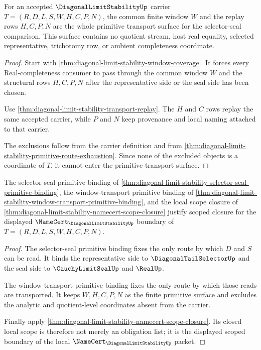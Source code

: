 \begin{theorem}
\label{thm:diagonal-limit-stability-window-transport-primitive-binding}
For an accepted $\DiagonalLimitStabilityUp$ carrier $T=(R,D,L,S,W,H,C,P,N)$, the common finite window $W$ and the replay rows $H,C,P,N$ are the whole primitive transport surface for the selector-seal comparison. This surface contains no quotient stream, host real equality, selected representative, trichotomy row, or ambient completeness coordinate.
\end{theorem}
\begin{proof}
Start with \autoref{thm:diagonal-limit-stability-window-coverage}. It forces every Real-completeness consumer to pass through the common window $W$ and the structural rows $H,C,P,N$ after the representative side or the seal side has been chosen.

Use \autoref{thm:diagonal-limit-stability-transport-replay}. The $H$ and $C$ rows replay the same accepted carrier, while $P$ and $N$ keep provenance and local naming attached to that carrier.

The exclusions follow from the carrier definition and from \autoref{thm:diagonal-limit-stability-primitive-route-exhaustion}. Since none of the excluded objects is a coordinate of $T$, it cannot enter the primitive transport surface.
\end{proof}

\begin{theorem}
\label{thm:diagonal-limit-stability-scoped-namecert-boundary}
The selector-seal primitive binding of \autoref{thm:diagonal-limit-stability-selector-seal-primitive-binding}, the window-transport primitive binding of \autoref{thm:diagonal-limit-stability-window-transport-primitive-binding}, and the local scope closure of \autoref{thm:diagonal-limit-stability-namecert-scope-closure} justify scoped closure for the displayed $\NameCert_{\DiagonalLimitStabilityUp}$ boundary of $T=(R,D,L,S,W,H,C,P,N)$.
\end{theorem}
\begin{proof}
The selector-seal primitive binding fixes the only route by which $D$ and $S$ can be read. It binds the representative side to $\DiagonalTailSelectorUp$ and the seal side to $\CauchyLimitSealUp$ and $\RealUp$.

The window-transport primitive binding fixes the only route by which those reads are transported. It keeps $W,H,C,P,N$ as the finite primitive surface and excludes the analytic and quotient-level coordinates absent from the carrier.

Finally apply \autoref{thm:diagonal-limit-stability-namecert-scope-closure}. Its closed local scope is therefore not merely an obligation list; it is the displayed scoped boundary of the local $\NameCert_{\DiagonalLimitStabilityUp}$ packet.
\end{proof}

